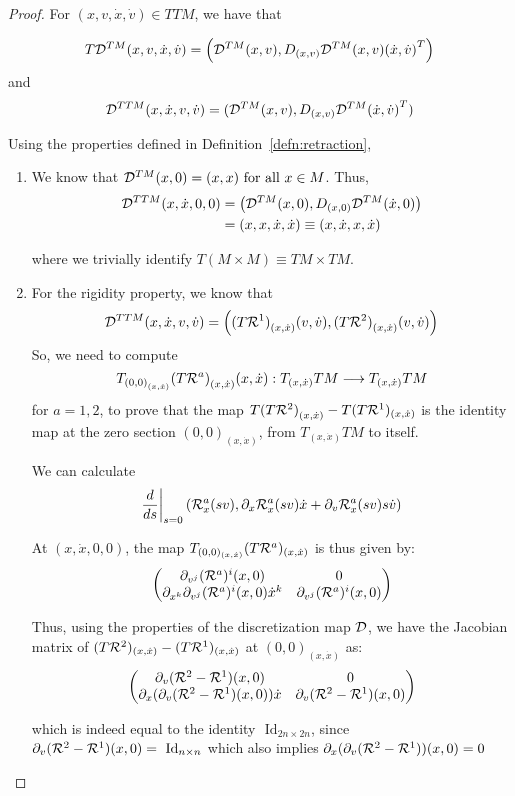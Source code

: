 \begin{proof}
  For $(x,v,\dot{x}, \dot{v}) \in TTM$, we have that 
  
  \[T\mathcal{D}^{TM}(x,v,\dot{x}, \dot{v}) = \left( \mathcal{D}^{TM}(x,v), D_{(x,v)} \mathcal{D}^{TM}(x,v) {(\dot{x}, \dot{v})}^T \right)\] and
  \[
    \mathcal{D}^{TTM}(x, \dot{x}, v, \dot{v}) = (\mathcal{D}^{TM}(x,v), D_{(x,v)}\mathcal{D}^{TM}{(\dot{x}, \dot{v})}^T) 
  \]

  Using the properties defined in Definition~\eqref{defn:retraction},  
  \begin{enumerate}
      \item We know that $\D^{TM}(x, 0) = (x,x) \ \forall x \in M$. Thus,
      \begin{equation*}
      \begin{split}
          \mathcal{D}^{TTM}(x,\dot{x}, 0, 0) & = \left( \mathcal{D}^{TM}(x, 0), D_{(x,0)} \mathcal{D}^{TM}(\dot{x}, 0) \right) \\
          & = (x,x, \dot{x}, \dot{x}) \equiv (x, \dot{x}, x, \dot{x})
      \end{split}
      \end{equation*}
       
      where we trivially identify $T(M \times M) \equiv TM \times TM$.
      \item For the rigidity property, we know that
      \[\mathcal{D}^{TTM}(x, \dot{x}, v, \dot{v}) = \left({(T\mathcal{R}^1)}_{(x,\dot{x})}(v, \dot{v}), {(T\mathcal{R}^2)}_{(x,\dot{x})}(v, \dot{v}) \right)\]
      So, we need to compute 
      \[T_{{(0,0)}_{(x,\dot{x})}}{(T\mathcal{R}^a)}_{(x, \dot{x})}(x, \dot{x}) : T_{(x, \dot{x})}TM \longrightarrow T_{(x, \dot{x})}TM\]
      for $a=1,2$, to prove that the map ${T(T\mathcal{R}^2)}_{(x,\dot{x})} - T(T\mathcal{R}^1)_{(x, \dot{x})}$ is the identity map at the zero section $(0,0)_{(x,\dot{x})}$, from $T_{(x, \dot{x})} TM$ to itself.

      We can calculate 
          \[\dfrac{d}{ds}\bigg|_{s=0} \left( \mathcal{R}^a_x( sv), \partial_{x} \mathcal{R}^a_x(sv) \dot{x} + \partial_v \mathcal{R}^a_x(sv) s \dot{v} \right)\]
      
      At $(x, \dot{x}, 0, 0)$, the map $T_{(0,0)_{(x, \dot{x})}}(T\mathcal{R}^a)_{(x, \dot{x})}$ is thus given by:
      \[\begin{pmatrix}
      \partial_{v^j}(\mathcal{R}^a)^i(x, 0) & 0 \\
      \partial_{x^k} \partial_{v^j} (\mathcal{R}^a)^i(x,0) \dot{x}^k & \partial_{v^j}(\mathcal{R}^a)^i(x,0)
      \end{pmatrix}\]
      
      \vspace{-1mm}
      Thus, using the properties of the discretization map $\mathcal{D}$, we have the Jacobian matrix of $(T\mathcal{R}^2)_{(x, \dot{x})} - (T\mathcal{R}^1)_{(x, \dot{x})}$ at $(0,0)_{(x, \dot{x})}$ as:
      \[\begin{pmatrix}
      \partial_{v}(\mathcal{R}^2-\mathcal{R}^1)(x,0) & 0 \\
      \partial_x(\partial_v(\mathcal{R}^2 - \mathcal{R}^1)(x,0))\dot{x} & \partial_v (\mathcal{R}^2-\mathcal{R}^1)(x,0)
      \end{pmatrix}
      \]

      \vspace{-1mm}
      which is indeed equal to the identity $\text{ Id}_{2n \times 2n}$, since $\partial_v (\mathcal{R}^2-\mathcal{R}^1)(x,0) = \text{ Id}_{n \times n}$ which also implies $\partial_x(\partial_v(\mathcal{R}^2 - \mathcal{R}^1))(x,0) = 0$
  \end{enumerate}
\end{proof}

